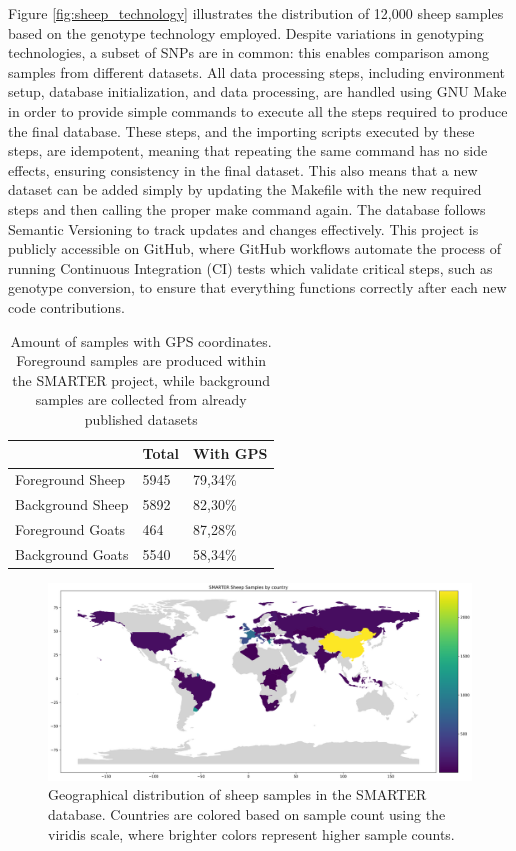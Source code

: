 \documentclass[a4paper,num-refs,gigabyte]{oup-contemporary}
\begin{document}
Figure \ref{fig:sheep_technology} illustrates the distribution of 12,000 sheep samples based on the genotype technology employed. Despite variations in genotyping technologies, a subset of SNPs are in common: this enables comparison among samples from different datasets.
All data processing steps, including environment setup, database initialization, and data processing, are handled using GNU Make\citep{Stallman2004} in order to provide simple commands to execute all the steps required to produce the final database. These steps, and the importing scripts executed by these steps, are idempotent, meaning that repeating the same command has no side effects, ensuring consistency in the final dataset. This also means that a new dataset can be added simply by updating the Makefile with the new required steps and then calling the proper make command again. The database follows Semantic Versioning\citep{prestonwerner2013semantic} to track updates and changes effectively. This project is publicly accessible on GitHub\citep{SMARTERDB-GH}, where GitHub workflows automate the process of running Continuous Integration (CI) tests which validate critical steps, such as genotype conversion, to ensure that everything functions correctly after each new code contributions.

\begin{table}
\caption{Amount of samples with GPS coordinates. Foreground samples are produced within the SMARTER project, while background samples are collected from already published datasets}
\label{tab:samples}
\begin{center}
\begin{tabular}{l l l}
\toprule
& Total & With GPS \\
\midrule
Foreground Sheep & 5945 & 79,34\% \\
Background Sheep & 5892 & 82,30\% \\
Foreground Goats & 464 & 87,28\% \\
Background Goats & 5540 & 58,34\% \\
\bottomrule
\end{tabular}
\end{center}
\end{table}

\begin{figure}
\centering
\includegraphics[width=.95\textwidth]{sheep-by-country.png}
\caption{Geographical distribution of sheep samples in the SMARTER database. Countries are colored based on sample count using the viridis scale, where brighter colors represent higher sample counts.}
\label{fig:sheep_samples}
\end{figure}
\end{document}
